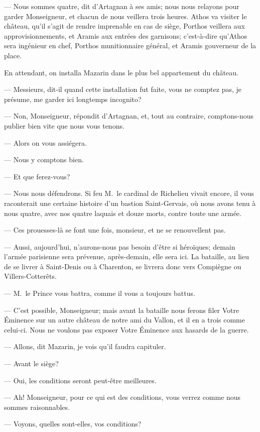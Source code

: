 — Nous sommes quatre, dit d'Artagnan à ses amis; nous nous relayons pour garder Monseigneur, et chacun de nous veillera trois heures. Athos va visiter le château, qu'il s'agit de rendre imprenable en cas de siège, Porthos veillera aux approvisionnements, et Aramis aux entrées des garnisons; c'est-à-dire qu'Athos sera ingénieur en chef, Porthos munitionnaire général, et Aramis gouverneur de la place.

En attendant, on installa Mazarin dans le plus bel appartement du château.

— Messieurs, dit-il quand cette installation fut faite, vous ne comptez pas, je présume, me garder ici longtemps incognito?

— Non, Monseigneur, répondit d'Artagnan, et, tout au contraire, comptons-nous publier bien vite que nous vous tenons.

— Alors on vous assiégera.

— Nous y comptons bien.

— Et que ferez-vous?

— Nous nous défendrons. Si feu M.~le cardinal de Richelieu vivait encore, il vous raconterait une certaine histoire d'un bastion Saint-Gervais, où nous avons tenu à nous quatre, avec nos quatre laquais et douze morts, contre toute une armée.

— Ces prouesses-là se font une fois, monsieur, et ne se renouvellent pas.

— Aussi, aujourd'hui, n'aurons-nous pas besoin d'être si héroïques; demain l'armée parisienne sera prévenue, après-demain, elle sera ici. La bataille, au lieu de se livrer à Saint-Denis ou à Charenton, se livrera donc vers Compiègne ou Villers-Cotterêts.

— M.~le Prince vous battra, comme il vous a toujours battus.

— C'est possible, Monseigneur; mais avant la bataille nous ferons filer Votre Éminence sur un autre château de notre ami du Vallon, et il en a trois comme celui-ci. Nous ne voulons pas exposer Votre Éminence aux hasards de la guerre.

— Allons, dit Mazarin, je vois qu'il faudra capituler.

— Avant le siège?

— Oui, les conditions seront peut-être meilleures.

— Ah! Monseigneur, pour ce qui est des conditions, vous verrez comme nous sommes raisonnables.

— Voyons, quelles sont-elles, vos conditions?


